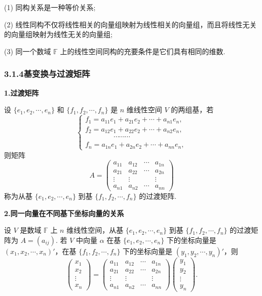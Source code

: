 \documentclass[UTF8,12pt,a4paper,fontset=fandol]{ctexart}
\begin{document}
(1) 同构关系是一种等价关系;

(2) 线性同构不仅将线性相关的向量组映射为线性相关的向量组，而且将线性无关的向量组映射为线性无关的向量组;

(3) 同一个数域 $\mathbb{F}$ 上的线性空间同构的充要条件是它们具有相同的维数.

\subsubsection*{3.1.4\quad 基变换与过渡矩阵}

\noindent\textbf{1.\quad 过渡矩阵}

设 $\{e_1,e_2,\cdots,e_n\}$ 和 $\{f_1,f_2,\cdots,f_n\}$ 是 $n$ 维线性空间 $V$ 的两组基，若
\[
\left\{
\begin{array}{l}
f_1=a_{11}e_1+a_{21}e_2+\cdots+a_{n1}e_n,\\
f_2=a_{12}e_1+a_{22}e_2+\cdots+a_{n2}e_n,\\
\hspace{4em}\cdots\cdots\cdots\\
f_n=a_{1n}e_1+a_{2n}e_2+\cdots+a_{nn}e_n,
\end{array}
\right.
\]
则矩阵
\[
A=
\begin{pmatrix}
a_{11} & a_{12} & \cdots & a_{1n}\\
a_{21} & a_{22} & \cdots & a_{2n}\\
\vdots & \vdots &        & \vdots\\
a_{n1} & a_{n2} & \cdots & a_{nn}
\end{pmatrix}
\]
称为从基 $\{e_1,e_2,\cdots,e_n\}$ 到基 $\{f_1,f_2,\cdots,f_n\}$ 的过渡矩阵.

\noindent\textbf{2.\quad 同一向量在不同基下坐标向量的关系}

设 $V$ 是数域 $\mathbb{F}$ 上 $n$ 维线性空间，从基 $\{e_1,e_2,\cdots,e_n\}$ 到基 $\{f_1,f_2,\cdots,f_n\}$ 的过渡矩阵为 $A=(a_{ij})$. 若 $V$ 中向量 $\alpha$ 在基 $\{e_1,e_2,\cdots,e_n\}$ 下的坐标向量是 $(x_1,x_2,\cdots,x_n)'$，在基 $\{f_1,f_2,\cdots,f_n\}$ 下的坐标向量是 $(y_1,y_2,\cdots,y_n)'$，则
\[
\begin{pmatrix}
x_1\\
x_2\\
\vdots\\
x_n
\end{pmatrix}
=
\begin{pmatrix}
a_{11} & a_{12} & \cdots & a_{1n}\\
a_{21} & a_{22} & \cdots & a_{2n}\\
\vdots & \vdots &        & \vdots\\
a_{n1} & a_{n2} & \cdots & a_{nn}
\end{pmatrix}
\begin{pmatrix}
y_1\\
y_2\\
\vdots\\
y_n
\end{pmatrix}.
\]
\end{document}
